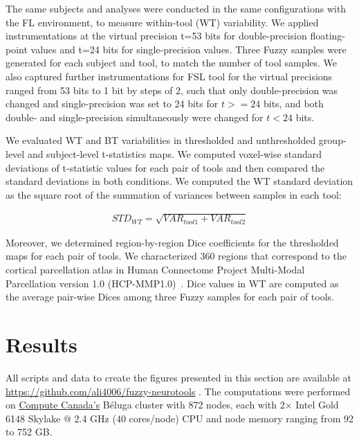 \documentclass[conference]{IEEEtran}
\begin{document}
The same subjects and analyses were conducted in the same configurations
with the FL environment, to measure within-tool (WT) variability. We
applied instrumentations at the virtual precision t=53 bits for
double-precision floating-point values and t=24 bits for single-precision
values. Three Fuzzy samples were generated for each subject and tool, to
match the number of tool samples.
We also captured further instrumentations for FSL tool for the virtual precisions ranged from 53 bits to 1 bit by steps of 2,
such that only double-precision was changed and single-precision was set to 24 bits for $t >= 24$ bits,
and both double- and single-precision simultaneously were changed for $t < 24$ bits.

We evaluated WT and BT variabilities in thresholded and unthresholded group-level and subject-level t-statistics maps.
We computed voxel-wise standard deviations of t-statistic values for each pair of tools
and then compared the standard deviations in both conditions.
We computed the WT standard deviation as the square root of the summation of variances between samples in each tool:

\begin{equation} \label{eq:mca_std}
  \begin{multlined}
  STD_{WT} = \sqrt{VAR_{tool1} + VAR_{tool2}}
  \end{multlined}
\end{equation}

Moreover, we determined region-by-region Dice coefficients for the thresholded maps for each pair of tools.
We characterized 360 regions that correspond to the cortical parcellation atlas
in Human Connectome Project Multi-Modal Parcellation version 1.0 (HCP-MMP1.0)~\cite{glasser2016multi}.
Dice values in WT are computed as the average pair-wise Dices among three Fuzzy samples for each pair of tools.

\section{Results}
All scripts and data to create the figures presented in this section are available at \url{https://github.com/ali4006/fuzzy-neurotools} .
The computations were performed on \href{https://www.computecanada.ca}{Compute Canada's} Béluga cluster
with 872 nodes, each with 2× Intel Gold 6148 Skylake @ 2.4 GHz (40 cores/node) CPU and node memory ranging from 92 to 752 GB.
\end{document}
